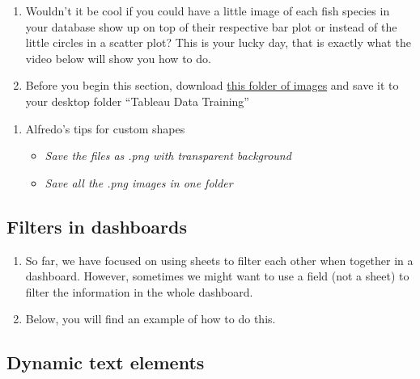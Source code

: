 \documentclass[
]{book}
\providecommand{\tightlist}{%
  \setlength{\itemsep}{0pt}\setlength{\parskip}{0pt}}
\begin{document}
\begin{enumerate}
\def\labelenumi{\arabic{enumi}.}
\item
  Wouldn't it be cool if you could have a little image of each fish species in your database show up on top of their respective bar plot or instead of the little circles in a scatter plot? This is your lucky day, that is exactly what the video below will show you how to do.
\item
  Before you begin this section, download \href{https://github.com/NCEAS/data-training-picrc-cos/raw/main/images/TNC\%20-\%20Fish\%20Images.zip}{this folder of images} and save it to your desktop folder ``Tableau Data Training''
\end{enumerate}

\begin{enumerate}
\def\labelenumi{\arabic{enumi}.}
\setcounter{enumi}{2}
\tightlist
\item
  Alfredo's tips for custom shapes

  \begin{itemize}
  \tightlist
  \item
    \emph{Save the files as .png with transparent background}
  \item
    \emph{Save all the .png images in one folder}
  \end{itemize}
\end{enumerate}

\hypertarget{filters-in-dashboards}{%
\subsection{Filters in dashboards}\label{filters-in-dashboards}}

\begin{enumerate}
\def\labelenumi{\arabic{enumi}.}
\item
  So far, we have focused on using sheets to filter each other when together in a dashboard. However, sometimes we might want to use a field (not a sheet) to filter the information in the whole dashboard.
\item
  Below, you will find an example of how to do this.
\end{enumerate}

\hypertarget{dynamic-text-elements}{%
\subsection{Dynamic text elements}\label{dynamic-text-elements}}
\end{document}
